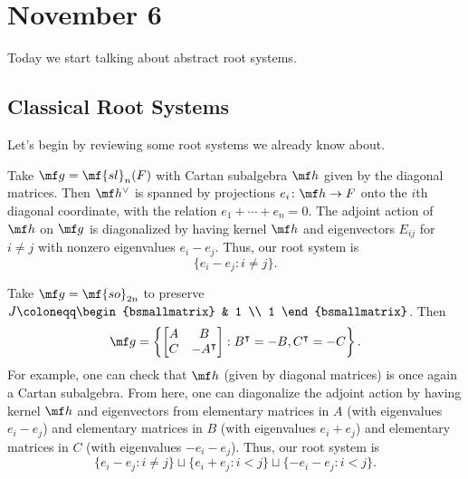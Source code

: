 \documentclass[../notes.tex]{subfiles}
\begin{document}
\section{November 6}
Today we start talking about abstract root systems.

\subsection{Classical Root Systems}
Let's begin by reviewing some root systems we already know about.
\begin{example}[type $A_{n-1}$]
	Take $\mf g=\mf{sl}_n(F)$ with Cartan subalgebra $\mf h$ given by the diagonal matrices. Then $\mf h^\lor$ is spanned by projections $e_i\colon\mf h\to F$ onto the $i$th diagonal coordinate, with the relation $e_1+\cdots+e_n=0$. The adjoint action of $\mf h$ on $\mf g$ is diagonalized by having kernel $\mf h$ and eigenvectors $E_{ij}$ for $i\ne j$ with nonzero eigenvalues $e_i-e_j$. Thus, our root system is
	\[\{e_i-e_j:i\ne j\}.\]
\end{example}
\begin{example}[type $D_n$]
	Take $\mf g=\mf{so}_{2n}$ to preserve $J\coloneqq\begin{bsmallmatrix}
		& 1 \\ 1
	\end{bsmallmatrix}$. Then
	\[\mf g=\left\{\begin{bmatrix}
		A & B \\ C & -A^\intercal
	\end{bmatrix}:B^\intercal=-B,C^\intercal=-C\right\}.\]
	For example, one can check that $\mf h$ (given by diagonal matrices) is once again a Cartan subalgebra. From here, one can diagonalize the adjoint action by having kernel $\mf h$ and eigenvectors from elementary matrices in $A$ (with eigenvalues $e_i-e_j$) and elementary matrices in $B$ (with eigenvalues $e_i+e_j$) and elementary matrices in $C$ (with eigenvalues $-e_i-e_j$). Thus, our root system is
	\[\{e_i-e_j:i\ne j\}\sqcup\{e_i+e_j:i<j\}\sqcup\{-e_i-e_j:i<j\}.\]
\end{example}
\end{document}
